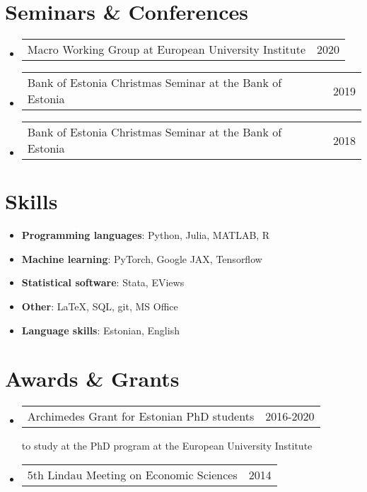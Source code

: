 \documentclass[a4, 11pt]{article}
\makeatletter
\newcommand{\resumeOtherHeading}[2]{
      \item
      \begin{tabularx}{0.97\textwidth}{X@{\extracolsep{2em}}r}
        #1 & #2
      \end{tabularx}
    }
\newcommand{\resumeSubHeadingListStart}{\begin{itemize}[leftmargin=0.15in, label={}]}
\newcommand{\resumeSubHeadingListEnd}{\end{itemize}}
\makeatother
\begin{document}
    \section*{Seminars \& Conferences}
  \resumeSubHeadingListStart
        \resumeOtherHeading
          {{Macro Working Group} at {European University Institute} }
          { 2020 }
        \resumeOtherHeading
          {{Bank of Estonia Christmas Seminar} at {the Bank of Estonia} }
          { 2019 }
        \resumeOtherHeading
          {{Bank of Estonia Christmas Seminar} at {the Bank of Estonia} }
          { 2018 }
    \resumeSubHeadingListEnd

    \section{Skills}\begin{itemize}[leftmargin=0.15in, label = {}]
      \item \small{ \textbf{Programming languages}: Python, Julia, MATLAB, R}
      \item \small{ \textbf{Machine learning}: PyTorch, Google JAX, Tensorflow}
      \item \small{ \textbf{Statistical software}: Stata, EViews}
      \item \small{ \textbf{Other}: LaTeX, SQL, git, MS Office}
      \item \small{ \textbf{Language skills}: Estonian, English}
  \end{itemize}

    \section{Awards \& Grants}
  \resumeSubHeadingListStart
        \resumeOtherHeading
          {  {Archimedes Grant for Estonian PhD students}{} }
          { 2016-2020 }
          {to study at the PhD program at the European University Institute}
        \resumeOtherHeading
          {  {5th Lindau Meeting on Economic Sciences}{} }
          { 2014 }
          {}
    \resumeSubHeadingListEnd

    
\end{document}
